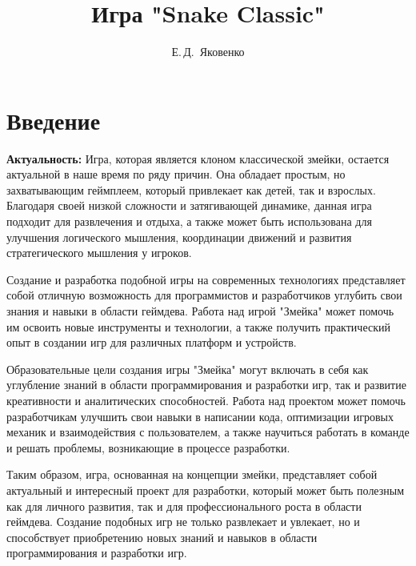 \documentclass[14pt, oneside]{altsu-report}
\title{Игра "Snake Classic"}
\author{Е.\,Д.~Яковенко}
\institute{Институт цифровых технологий, электроники и физики}
\date{\the\year}
\begin{document}
\maketitle

\setcounter{page}{2}
\tableofcontents

\chapter*{Введение}

\textbf{Актуальность:}
Игра, которая является клоном классической змейки, остается актуальной в наше время по ряду причин. Она обладает простым, но захватывающим геймплеем, который привлекает как детей, так и взрослых. Благодаря своей низкой сложности и затягивающей динамике, данная игра подходит для развлечения и отдыха, а также может быть использована для улучшения логического мышления, координации движений и развития стратегического мышления у игроков.

Создание и разработка подобной игры на современных технологиях представляет собой отличную возможность для программистов и разработчиков углубить свои знания и навыки в области геймдева. Работа над игрой "Змейка" может помочь им освоить новые инструменты и технологии, а также получить практический опыт в создании игр для различных платформ и устройств.

Образовательные цели создания игры "Змейка" могут включать в себя как углубление знаний в области программирования и разработки игр, так и развитие креативности и аналитических способностей. Работа над проектом может помочь разработчикам улучшить свои навыки в написании кода, оптимизации игровых механик и взаимодействия с пользователем, а также научиться работать в команде и решать проблемы, возникающие в процессе разработки.

Таким образом, игра, основанная на концепции змейки, представляет собой актуальный и интересный проект для разработки, который может быть полезным как для личного развития, так и для профессионального роста в области геймдева. Создание подобных игр не только развлекает и увлекает, но и способствует приобретению новых знаний и навыков в области программирования и разработки игр.
\end{document}
